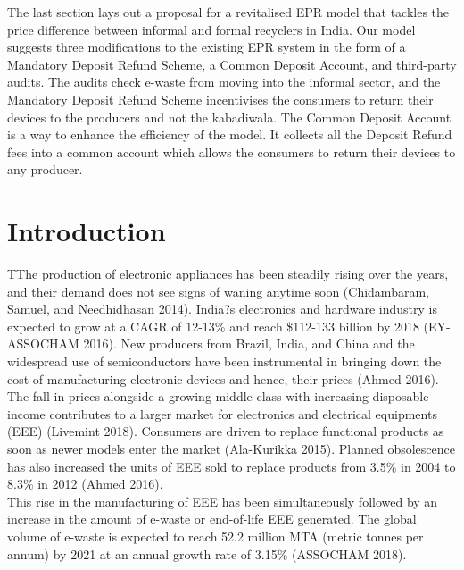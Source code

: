 \documentclass[a4paper, 12pt]{article}
\begin{document}
                    The last section lays out a proposal for a revitalised EPR model that tackles the price difference between informal and formal recyclers in India. Our model suggests three modifications to the existing EPR system in the form of a Mandatory Deposit Refund Scheme, a Common Deposit Account, and third-party audits. The audits check e-waste from moving into the informal sector, and the Mandatory Deposit Refund Scheme incentivises the consumers to return their devices to the producers and not the kabadiwala. The Common Deposit Account is a way to enhance the efficiency of the model. It collects all the Deposit Refund fees into a common account which allows the consumers to return their devices to any producer. \\
                    
                    \newpage
                    \section{Introduction}
                    TThe production of electronic appliances has been steadily rising over the years, and their demand does not see signs of waning anytime soon (Chidambaram, Samuel, and Needhidhasan 2014). India?s electronics and hardware industry is expected to grow at a CAGR of 12-13\% and reach \$112-133 billion by 2018 (EY-ASSOCHAM 2016). New producers from Brazil, India, and China and the widespread use of semiconductors have been instrumental in bringing down the cost of manufacturing electronic devices and hence, their prices (Ahmed 2016). \\
                    
                    The fall in prices alongside a growing middle class with increasing disposable income contributes to a larger market for electronics and electrical equipments (EEE) (Livemint 2018). Consumers are driven to replace functional products as soon as newer models enter the market (Ala-Kurikka 2015). Planned obsolescence has also increased the units of EEE sold to replace products from 3.5\% in 2004 to 8.3\% in 2012 (Ahmed 2016).\\
                    
                    This rise in the manufacturing of EEE has been simultaneously followed by an increase in the amount of e-waste or end-of-life EEE generated. The global volume of e-waste is expected to reach 52.2 million MTA (metric tonnes per annum) by 2021 at an annual growth rate of 3.15\% (ASSOCHAM 2018). \\
                    
\end{document}
